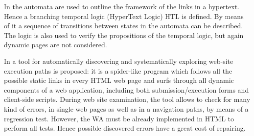 In \cite{stotts-98} the automata are used to outline the framework of the links in a hypertext. Hence a branching temporal logic (HyperText Logic) HTL is defined. By means of it a sequence of transitions between states in the automata can be described. The logic is also used to verify the propositions of the temporal logic, but again dynamic pages are not considered.

In \cite{veriweb} a tool for automatically discovering and systematically exploring web-site execution paths is proposed: it is a spider-like program which follows all the possible static links in every HTML web page and surfs through all dynamic components of a web application, including both submission/execution forms and client-side scripts. During web site examination, the tool allows to check for many kind of errors, in single web pages as well as in a navigation paths, by means of a regression test. However, the WA must be already implemented in HTML to perform all tests. Hence possible discovered errors have a great cost of repairing.